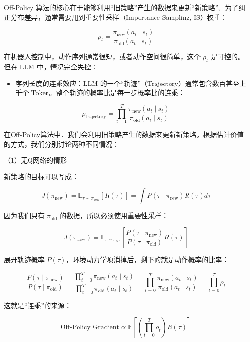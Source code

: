 Off-Policy 算法的核心在于能够利用``旧策略''产生的数据来更新``新策略''。为了纠正分布差异，通常需要用到重要性采样（Importance Sampling, IS）权重：

\[
\rho_t
=
\frac{\pi_{\mathrm{new}}(a_t \mid s_t)}
{\pi_{\mathrm{old}}(a_t \mid s_t)}
\]

在机器人控制中，动作序列通常很短，或者动作空间很简单，这个 \(\rho_t\) 是可控的。但在 LLM 中，情况完全失控：

\begin{itemize}
\tightlist
\item
{}
  序列长度的连乘效应：LLM 的一个``轨迹''（Trajectory）通常包含数百甚至上千个 Token。整个轨迹的概率比是每一步概率比的连乘：
\end{itemize}

\[
\rho_{\mathrm{trajectory}}
=
\prod_{t=1}^{T}
\frac{\pi_{\mathrm{new}}(a_t\mid s_t)}
{\pi_{\mathrm{old}}(a_t\mid s_t)}
\]

在Off-Policy算法中，我们会利用旧策略产生的数据来更新新策略。根据估计价值的方式，我们分别讨论两种不同情况：

（1）无Q网络的情形

新策略的目标可以写成：

\[
J(\pi_{\mathrm{new}})
=
\mathbb{E}_{\tau\sim\pi_{\mathrm{new}}}[R(\tau)]
=
\int P(\tau\mid\pi_{\mathrm{new}})R(\tau)d\tau
\]

因为我们只有 \(\pi_{\mathrm{old}}\) 的数据，所以必须使用重要性采样：

\[
J(\pi_{\mathrm{new}})
=
\mathbb{E}_{\tau\sim\pi_{\mathrm{old}}}
\left[
\frac{P(\tau\mid\pi_{\mathrm{new}})}
{P(\tau\mid\pi_{\mathrm{old}})}
R(\tau)
\right]
\]

展开轨迹概率 \(P(\tau)\)，环境动力学项消掉后，剩下的就是动作概率的比率：

\[
\frac{P(\tau\mid\pi_{\mathrm{new}})}
{P(\tau\mid\pi_{\mathrm{old}})}
=
\frac{\prod_{t=0}^{T}\pi_{\mathrm{new}}(a_t\mid s_t)}
{\prod_{t=0}^{T}\pi_{\mathrm{old}}(a_t\mid s_t)}
=
\prod_{t=0}^{T}
\frac{\pi_{\mathrm{new}}(a_t\mid s_t)}
{\pi_{\mathrm{old}}(a_t\mid s_t)}
=
\prod_{t=0}^{T}\rho_t
\]

这就是``连乘''的来源：

\[
\text{Off-Policy Gradient}
\propto
\mathbb{E}
\left[
\left(\prod_{t=0}^{T}\rho_t\right)R(\tau)
\right]
\]


